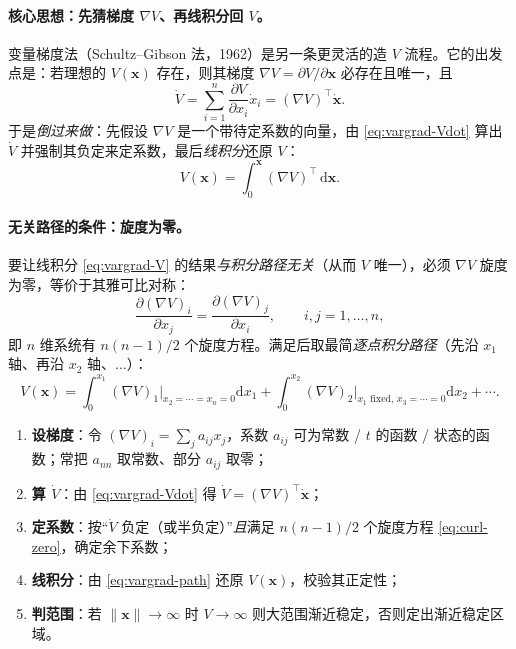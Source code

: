 \paragraph{核心思想：先猜梯度 $\nabla V$、再线积分回 $V$。}
变量梯度法（Schultz–Gibson 法，1962）是另一条更灵活的造 $V$ 流程\cite{slotine1991applied}。它的出发点是：若理想的 $V(\mathbf{x})$ 存在，则其梯度 $\nabla V=\partial V/\partial\mathbf{x}$ 必存在且唯一，且
\begin{equation}
  \dot V=\sum_{i=1}^n\frac{\partial V}{\partial x_i}\dot x_i=(\nabla V)^\top\dot{\mathbf{x}}.
  \label{eq:vargrad-Vdot}
\end{equation}
于是\emph{倒过来做}：先假设 $\nabla V$ 是一个带待定系数的向量，由 \cref{eq:vargrad-Vdot} 算出 $\dot V$ 并强制其负定来定系数，最后\emph{线积分}还原 $V$：
\begin{equation}
  V(\mathbf{x})=\int_0^{\mathbf{x}}(\nabla V)^\top\,\mathrm d\mathbf{x}.
  \label{eq:vargrad-V}
\end{equation}

\paragraph{无关路径的条件：旋度为零。}
要让线积分 \cref{eq:vargrad-V} 的结果\emph{与积分路径无关}（从而 $V$ 唯一），必须 $\nabla V$ 旋度为零，等价于其雅可比对称：
\begin{equation}
  \frac{\partial(\nabla V)_i}{\partial x_j}=\frac{\partial(\nabla V)_j}{\partial x_i},\qquad i,j=1,\dots,n,
  \label{eq:curl-zero}
\end{equation}
即 $n$ 维系统有 $n(n-1)/2$ 个旋度方程。满足后取最简\emph{逐点积分路径}（先沿 $x_1$ 轴、再沿 $x_2$ 轴、$\dots$）：
\begin{equation}
  V(\mathbf{x})=\int_0^{x_1}\!(\nabla V)_1\big|_{x_2=\cdots=x_n=0}\mathrm dx_1
  +\int_0^{x_2}\!(\nabla V)_2\big|_{x_1\text{ fixed},\,x_3=\cdots=0}\mathrm dx_2+\cdots.
  \label{eq:vargrad-path}
\end{equation}

\begin{algo}[变量梯度法步骤]\label{algo:vargrad}
\begin{enumerate}
  \item \textbf{设梯度}：令 $(\nabla V)_i=\sum_j a_{ij}x_j$，系数 $a_{ij}$ 可为常数 / $t$ 的函数 / 状态的函数；常把 $a_{nn}$ 取常数、部分 $a_{ij}$ 取零；
  \item \textbf{算 $\dot V$}：由 \cref{eq:vargrad-Vdot} 得 $\dot V=(\nabla V)^\top\dot{\mathbf{x}}$；
  \item \textbf{定系数}：按“$\dot V$ 负定（或半负定）”\emph{且}满足 $n(n-1)/2$ 个旋度方程 \cref{eq:curl-zero}，确定余下系数；
  \item \textbf{线积分}：由 \cref{eq:vargrad-path} 还原 $V(\mathbf{x})$，校验其正定性；
  \item \textbf{判范围}：若 $\|\mathbf{x}\|\to\infty$ 时 $V\to\infty$ 则大范围渐近稳定，否则定出渐近稳定区域。
\end{enumerate}
\end{algo}

